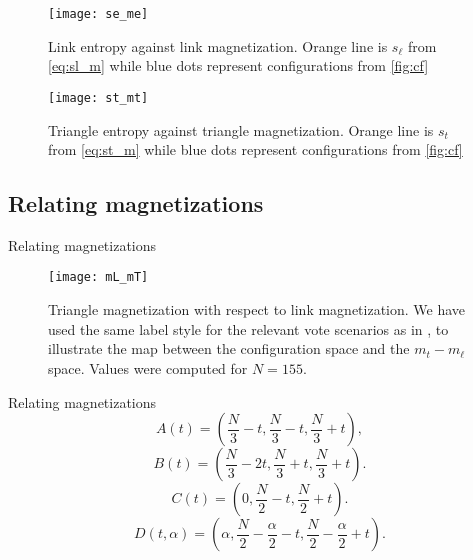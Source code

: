 \begin{frame}
 \begin{figure}
     \centering
	 \texttt{[image: se\_me]}
     \caption{Link entropy against link magnetization. Orange line is $s_\ell$ from \cref{eq:sl_m} while blue dots represent configurations from \cref{fig:cf}}
     \label{fig:sL_mL}
 \end{figure}
\end{frame}

\begin{frame}
 \begin{figure}[!h]
     \centering
	 \texttt{[image: st\_mt]}
     \caption{Triangle entropy against triangle magnetization. Orange line is $s_t$ from \cref{eq:st_m} while blue dots represent configurations from \cref{fig:cf}}
     \label{fig:sT_mT}
 \end{figure}
\end{frame}

\subsection{Relating magnetizations}

\begin{frame}{Relating magnetizations}
	\begin{figure}
    \centering
    \texttt{[image: mL\_mT]}
    \caption{Triangle magnetization with respect to link magnetization. We have used the same label style for the relevant vote scenarios as in , to illustrate the map between the configuration space and the $m_t-m_\ell$ space. Values were computed for $N=155$.\label{fig:mL_mT}} 
\end{figure}    
\end{frame}

\begin{frame}{Relating magnetizations}
	\begin{equation}A(t) =  \left(\frac{N}{3} - t, \frac{N}{3} - t, \frac{N}{3} +t\right), \label{eq:pathA}\end{equation}
	\begin{equation}B(t) = \left(\frac{N}{3} -2t,\frac{N}{3}+t,\frac{N}{3}+t\right).\label{eq:pathB}\end{equation}
	\begin{equation}C(t) = \left(0,\frac{N}{2}-t,\frac{N}{2}+t\right).\label{eq:pathC}\end{equation}
	   \begin{equation}
		   D(t,\alpha) = \left(\alpha,\frac{N}{2}-\frac{\alpha}{2}-t,\frac{N}{2}-\frac{\alpha}{2}+t\right).\label{eq:pathD}
	   \end{equation}
\end{frame}

